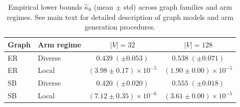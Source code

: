 
\begin{table}[h!]
\centering
\caption{Empirical lower bounds $\hat{\kappa}_0$ (mean $\pm$ std) across graph families and arm regimes. 
See main text for detailed description of graph models and arm generation procedures.}
\begin{tabular}{llcc}
\toprule
Graph & Arm regime  & $|V|=32$ & $|V|=128$ \\
\midrule

ER & Diverse & $0.439 \; (\pm 0.053)$ & $0.538 \; (\pm 0.071)$ \\
ER & Local & $(3.98 \pm 0.17)\times 10^{-5}$ & $(1.90 \pm 0.00)\times 10^{-5}$ \\
\midrule
SB & Diverse & $0.420 \; (\pm 0.020)$ & $0.555 \; (\pm 0.018)$ \\
SB & Local & $(7.12 \pm 0.35)\times 10^{-6}$ & $(3.61 \pm 0.00)\times 10^{-5}$ \\
\bottomrule
\end{tabular}
\end{table}
